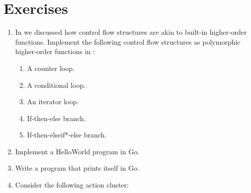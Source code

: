 \section*{Exercises}

\renewcommand{\theenumi}{\bf\arabic{enumi}}

\begin{enumerate}

\item {} In  we discussed how
control flow structures are akin to built-in higher-order functions. Implement
the following control flow structures as polymorphic higher-order functions in
\fun:

\begin{enumerate}

\item A counter loop.

\item A conditional loop.

\item An iterator loop.

\item If-then-else branch.

\item If-then-elseif*-else branch.

\end{enumerate}

\item Implement a HelloWorld program in Go.

\item Write a program that prints itself in Go.

\item Consider the following action cluster:


\begin{codebox}
\end{codebox}

\end{enumerate}

